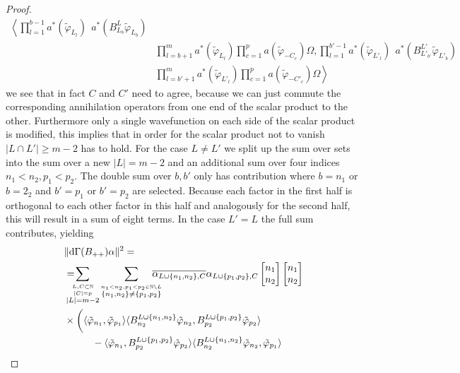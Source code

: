 \documentclass[b5paper,draft,openbib,12pt]{memoir}
\begin{document}
\begin{proof}
\begin{align}
\left\langle \prod_{l=1}^{b-1} a^*(\tilde{\varphi}_{L_l})  ~~ a^*(B^{L}_{L_b} \tilde{\varphi}_{L_b})\right.  \\\nonumber
&\prod_{l=b+1}^m a^*(\tilde{\varphi}_{L_l}) \prod_{c=1}^p a(\tilde{\varphi}_{-C_c}) \Omega, 
\prod_{l=1}^{b'-1} a^*(\tilde{\varphi}_{L'_l})  ~~ a^*(B_{L'_{b'}}^{L'} \tilde{\varphi}_{L'_b})  \\
&\left.\prod_{l=b'+1}^m a^*(\tilde{\varphi}_{L'_l}) \prod_{c=1}^p a(\tilde{\varphi}_{-C'_c}) \Omega\right\rangle
\end{align}
we see that in fact \(C\) and \(C'\) need to agree, because 
we can just commute the corresponding annihilation operators 
from one end of the 
scalar product to the other. Furthermore only a single 
wavefunction on each side of the scalar product is modified, 
this implies that in order for the
scalar product not to vanish \(|L\cap L'|\ge m-2\) has to 
hold. For the case  \(L\neq L'\) we split up the sum over sets 
into the sum over a new \(|L|=m-2\) and an additional sum 
over four indices \(n_1<n_2, p_1<p_2\). 
The double sum over \(b,b'\) only has  
contribution where 
\(b=n_1\) or \(b=2_2\) and \(b'=p_1\) or \(b'=p_2\) 
are selected. Because each factor in the first half is
orthogonal to each other factor in this half and analogously 
for the second half, this will result in a sum of eight terms. 
In the case 
\(L'=L\) the full sum contributes, yielding 
\begin{align}\nonumber
&\|\mathrm{d}\Gamma(B_{++})\alpha\|^2 = \\\nonumber
&= \hspace{-0.4cm}\sum_{\overset{L,C\subset \mathbb{N}}{\overset{|C|=p}{|L|=m-2}}}\sum_{\overset{n_1<n_2,p_1<p_2\in\mathbb{N}\backslash L }{\{n_1,n_2\}\neq \{p_1,p_2\}}}
\hspace{-0.4cm}\overline{\alpha_{L\cup\{n_1,n_2\},C}}\alpha_{L\cup\{p_1,p_2\},C}
\left[\begin{matrix}n_1\\n_2\end{matrix}\right]\left[\begin{matrix}n_1\\n_2\end{matrix}\right]\\\label{B++estimate}
  &\times \bigg(\langle \tilde{\varphi}_{n_1},\tilde{\varphi}_{p_1} \rangle \langle B^{L\cup\{n_1,n_2\}}_{n_2} \tilde{\varphi}_{n_2}, B^{L\cup\{p_1,p_2\}}_{p_2}\tilde{\varphi}_{p_2}\rangle\\
  &\hspace{1cm}-\langle \tilde{\varphi}_{n_1},B^{L\cup\{p_1,p_2\}}_{p_2}\tilde{\varphi}_{p_2} \rangle \langle B^{L\cup\{n_1,n_2\}}_{n_2} \tilde{\varphi}_{n_2}, \tilde{\varphi}_{p_1}\rangle \\

\end{align}
\end{proof}
\end{document}
